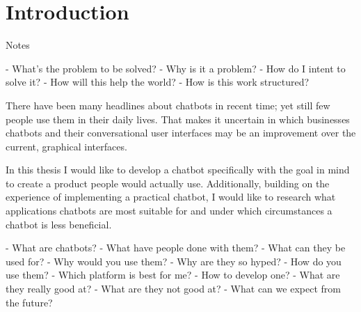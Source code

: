 \chapter{Introduction}

Notes

-	What's the problem to be solved?
-	Why is it a problem?
-	How do I intent to solve it?
-	How will this help the world?
-	How is this work structured?


There have been many headlines about chatbots in recent time; yet still few people use them in their daily lives. That makes it uncertain in which businesses chatbots and their conversational user interfaces may be an improvement over the current, graphical interfaces.

In this thesis I would like to develop a chatbot specifically with the goal in mind to create a product people would actually use. Additionally, building on the experience of implementing a practical chatbot, I would like to research what applications chatbots are most suitable for and under which circumstances a chatbot is less beneficial.

-	What are chatbots?
-	What have people done with them?
-	What can they be used for?
-	Why would you use them?
-	Why are they so hyped?
-	How do you use them?
-	Which platform is best for me?
-	How to develop one?
-	What are they really good at?
-	What are they not good at?
-	What can we expect from the future?
